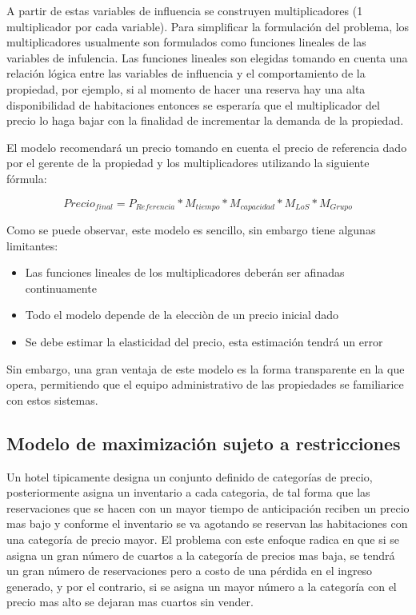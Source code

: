 {A partir de estas variables de influencia se construyen multiplicadores (1 multiplicador por cada variable). Para simplificar la formulación del problema, los multiplicadores usualmente son formulados como funciones lineales de las variables de infulencia. Las funciones lineales son elegidas tomando en cuenta una relación lógica entre las variables de influencia y el comportamiento de la propiedad, por ejemplo, si al momento de hacer una reserva hay una alta disponibilidad de habitaciones entonces se esperaría que el multiplicador del precio lo haga bajar con la finalidad de incrementar la demanda de la propiedad.

El modelo recomendará un precio tomando en cuenta el precio de referencia dado por el gerente de la propiedad y los multiplicadores utilizando la siguiente fórmula:

$$Precio_{final} = P_{Referencia} * M_{tiempo} * M_{capacidad} * M_{LoS} * M_{Grupo}$$

Como se puede observar, este modelo es sencillo, sin embargo tiene algunas limitantes:
\begin{itemize}
  \item Las funciones lineales de los multiplicadores deberán ser afinadas continuamente
  \item Todo el modelo depende de la elecciòn de un precio inicial dado
  \item Se debe estimar la elasticidad del precio, esta estimación tendrá un error
\end{itemize}

Sin embargo, una gran ventaja de este modelo es la forma transparente en la que opera, permitiendo que el equipo administrativo de las propiedades se familiarice con estos sistemas.



\subsection*{Modelo de maximización sujeto a restricciones}

Un hotel tipicamente designa un conjunto definido de categorías de precio, posteriormente asigna un inventario a cada categoria, de tal forma que las reservaciones que se hacen con un mayor tiempo de anticipación reciben un precio mas bajo y conforme el inventario se va agotando se reservan las habitaciones con una categoría de precio mayor. El problema con este enfoque radica en que si se asigna un gran número de cuartos a la categoría de precios mas baja, se tendrá un gran número de reservaciones pero a costo de una pérdida en el ingreso generado, y por el contrario, si se asigna un mayor número a la categoría con el precio mas alto se dejaran mas cuartos sin vender.

}
